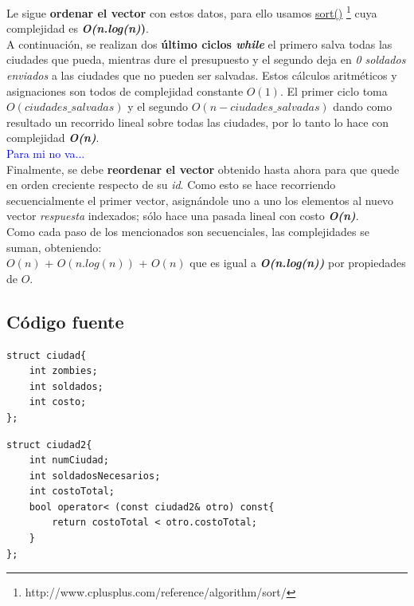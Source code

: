 \documentclass[a4paper]{article}
\begin{document}
Le sigue \textbf{ordenar el vector} con estos datos, para ello usamos \href{http://www.cplusplus.com/reference/algorithm/sort/}{sort()} \footnote{http://www.cplusplus.com/reference/algorithm/sort/} cuya complejidad es \textbf{\textit{O(n.log(n)})}.\\

A continuaci\'on, se realizan dos \textbf{\'ultimo ciclos \emph{while}} el primero salva todas las ciudades que pueda, mientras dure el presupuesto y el segundo deja en \emph{0 soldados enviados} a las ciudades que no pueden ser salvadas. Estos c\'alculos aritm\'eticos y asignaciones son todos de complejidad constante $O(1)$. El primer ciclo toma $O(ciudades\_salvadas)$ y el segundo $O(n-ciudades\_salvadas)$ dando como resultado un recorrido lineal sobre todas las ciudades, por lo tanto lo hace con complejidad \textbf{\textit{O(n)}}.\\

\textcolor{blue}{Para mi no va...}\\

Finalmente, se debe \textbf{reordenar el vector} obtenido hasta ahora para que quede en orden creciente respecto de su \textit{id}. Como esto se hace recorriendo secuencialmente el primer vector, asign\'andole uno a uno los elementos al nuevo vector \emph{respuesta} indexados; s\'olo hace una pasada lineal con costo \textbf{\textit{O(n)}}.\\

Como cada paso de los mencionados son secuenciales, las complejidades se suman, obteniendo:\\

$O(n)$ + $O(n.log(n))$ + $O(n)$ 
 que es igual a \textit{\textbf{O(n.log(n))}} por propiedades de $O$.


\newpage

\subsection{C\'odigo fuente}

	\begin{codesnippet}
	\begin{verbatim}
struct ciudad{
    int zombies;
    int soldados;
    int costo;
};
	\end{verbatim}
	\end{codesnippet}

	\begin{codesnippet}
	\begin{verbatim}
struct ciudad2{
    int numCiudad;
    int soldadosNecesarios;
    int costoTotal;
    bool operator< (const ciudad2& otro) const{
        return costoTotal < otro.costoTotal;
    }
};
	\end{verbatim}
	\end{codesnippet}
\end{document}

